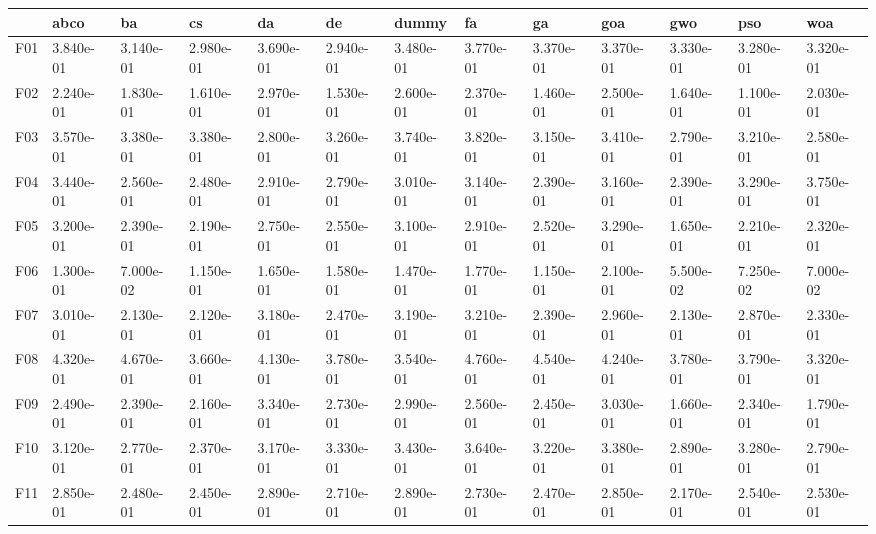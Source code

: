 \begin{table}
    \begin{adjustbox}{width=\linewidth}
        \begin{tabular}{lllllllllllll}
            \toprule
            {}   & abco      & ba        & cs        & da        & de        & dummy     & fa        & ga        & goa       & gwo       & pso       & woa       \\
            \midrule
            F01  & 3.840e-01 & 3.140e-01 & 2.980e-01 & 3.690e-01 & 2.940e-01 & 3.480e-01 & 3.770e-01 & 3.370e-01 & 3.370e-01 & 3.330e-01 & 3.280e-01 & 3.320e-01 \\
            F02  & 2.240e-01 & 1.830e-01 & 1.610e-01 & 2.970e-01 & 1.530e-01 & 2.600e-01 & 2.370e-01 & 1.460e-01 & 2.500e-01 & 1.640e-01 & 1.100e-01 & 2.030e-01 \\
            F03  & 3.570e-01 & 3.380e-01 & 3.380e-01 & 2.800e-01 & 3.260e-01 & 3.740e-01 & 3.820e-01 & 3.150e-01 & 3.410e-01 & 2.790e-01 & 3.210e-01 & 2.580e-01 \\
            F04  & 3.440e-01 & 2.560e-01 & 2.480e-01 & 2.910e-01 & 2.790e-01 & 3.010e-01 & 3.140e-01 & 2.390e-01 & 3.160e-01 & 2.390e-01 & 3.290e-01 & 3.750e-01 \\
            F05  & 3.200e-01 & 2.390e-01 & 2.190e-01 & 2.750e-01 & 2.550e-01 & 3.100e-01 & 2.910e-01 & 2.520e-01 & 3.290e-01 & 1.650e-01 & 2.210e-01 & 2.320e-01 \\
            F06  & 1.300e-01 & 7.000e-02 & 1.150e-01 & 1.650e-01 & 1.580e-01 & 1.470e-01 & 1.770e-01 & 1.150e-01 & 2.100e-01 & 5.500e-02 & 7.250e-02 & 7.000e-02 \\
            F07  & 3.010e-01 & 2.130e-01 & 2.120e-01 & 3.180e-01 & 2.470e-01 & 3.190e-01 & 3.210e-01 & 2.390e-01 & 2.960e-01 & 2.130e-01 & 2.870e-01 & 2.330e-01 \\
            F08  & 4.320e-01 & 4.670e-01 & 3.660e-01 & 4.130e-01 & 3.780e-01 & 3.540e-01 & 4.760e-01 & 4.540e-01 & 4.240e-01 & 3.780e-01 & 3.790e-01 & 3.320e-01 \\
            F09  & 2.490e-01 & 2.390e-01 & 2.160e-01 & 3.340e-01 & 2.730e-01 & 2.990e-01 & 2.560e-01 & 2.450e-01 & 3.030e-01 & 1.660e-01 & 2.340e-01 & 1.790e-01 \\
            F10  & 3.120e-01 & 2.770e-01 & 2.370e-01 & 3.170e-01 & 3.330e-01 & 3.430e-01 & 3.640e-01 & 3.220e-01 & 3.380e-01 & 2.890e-01 & 3.280e-01 & 2.790e-01 \\
            F11  & 2.850e-01 & 2.480e-01 & 2.450e-01 & 2.890e-01 & 2.710e-01 & 2.890e-01 & 2.730e-01 & 2.470e-01 & 2.850e-01 & 2.170e-01 & 2.540e-01 & 2.530e-01 \\

\end{tabular}
\end{adjustbox}
\end{table}
